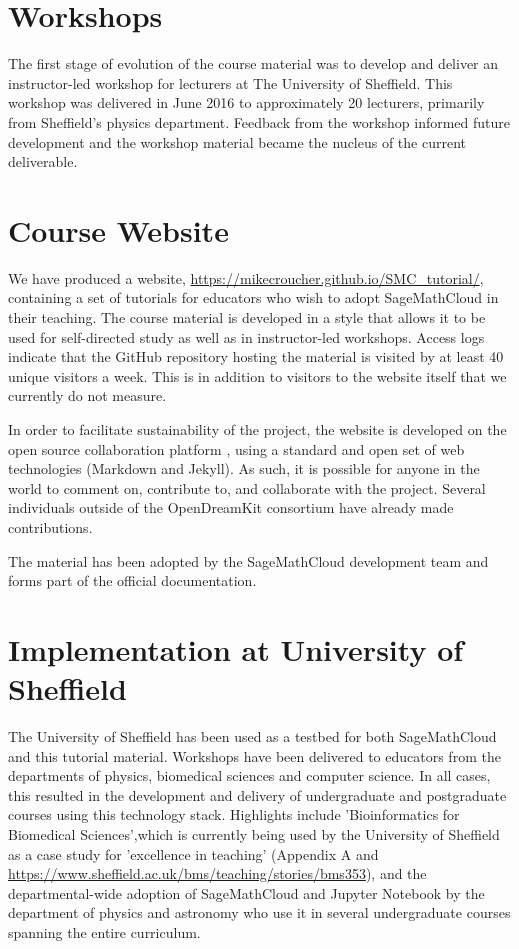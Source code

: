\documentclass{deliverablereport}
\author{Mike Croucher and Tania Allard}
\begin{document}
\enlargethispage{1.5cm}
\maketitle
\strut\githubissuedescription
\vspace{-.25cm}
\tableofcontents\newpage
\section{Workshops}
The first stage of evolution of the course material was to develop and deliver an instructor-led workshop for lecturers at The University of Sheffield.
This workshop was delivered in June 2016 to approximately 20 lecturers, primarily from Sheffield's physics department. Feedback from the workshop informed future development and the workshop material became the nucleus of the current deliverable.
\section{Course Website}
We have produced a website, \url{https://mikecroucher.github.io/SMC_tutorial/}, containing a set of tutorials for educators who wish to adopt SageMathCloud in their teaching. The course material is developed in a style that allows it to be used for self-directed study as well as in instructor-led workshops.
Access logs indicate that the GitHub repository hosting the material is visited by at least 40 unique visitors a week. This is in addition to visitors to the website itself that we currently do not measure.

In order to facilitate sustainability of the project, the website is
developed on the open source collaboration platform \GitHub, using a standard and open set of web technologies (Markdown and Jekyll). As such, it is possible for anyone in the world to comment on, contribute to, and collaborate with the project.
Several individuals outside of the OpenDreamKit consortium have already made contributions.

The material has been adopted by the SageMathCloud development team and forms part of the official documentation.
\section{Implementation at University of Sheffield}
The University of Sheffield has been used as a testbed for both SageMathCloud and this tutorial material. Workshops have been delivered to educators from the departments of physics, biomedical sciences and computer science. In all cases, this resulted in the development and delivery of undergraduate and postgraduate courses using this technology stack. Highlights include 'Bioinformatics for Biomedical Sciences',which is currently being used by the University of Sheffield as a case study for 'excellence in teaching' (Appendix A and \url{https://www.sheffield.ac.uk/bms/teaching/stories/bms353}), and the departmental-wide adoption of SageMathCloud and Jupyter Notebook by the department of physics and astronomy who use it in several undergraduate courses spanning the entire curriculum.
\end{document}

